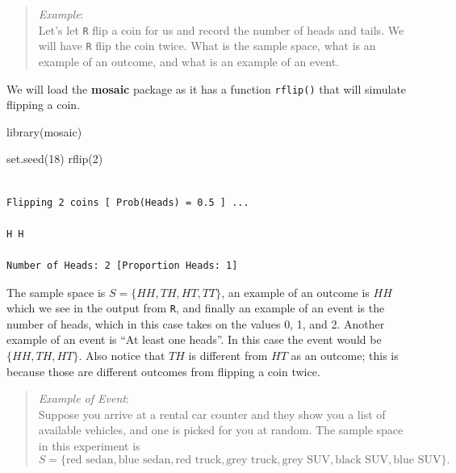 \documentclass[
  letterpaper,
  DIV=11,
  numbers=noendperiod]{scrreprt}
\newenvironment{Shaded}{\begin{snugshade}}{\end{snugshade}}
\newcommand{\DecValTok}[1]{\textcolor[rgb]{0.68,0.00,0.00}{#1}}
\newcommand{\FunctionTok}[1]{\textcolor[rgb]{0.28,0.35,0.67}{#1}}
\newcommand{\NormalTok}[1]{\textcolor[rgb]{0.00,0.23,0.31}{#1}}
\begin{document}
\begin{quote}
\emph{Example}:\\
Let's let \texttt{R} flip a coin for us and record the number of heads
and tails. We will have \texttt{R} flip the coin twice. What is the
sample space, what is an example of an outcome, and what is an example
of an event.
\end{quote}

We will load the \textbf{mosaic} package as it has a function
\texttt{rflip()} that will simulate flipping a coin.

\begin{Shaded}
\begin{Highlighting}[]
\FunctionTok{library}\NormalTok{(mosaic)}
\end{Highlighting}
\end{Shaded}

\begin{Shaded}
\begin{Highlighting}[]
\FunctionTok{set.seed}\NormalTok{(}\DecValTok{18}\NormalTok{)}
\FunctionTok{rflip}\NormalTok{(}\DecValTok{2}\NormalTok{)}
\end{Highlighting}
\end{Shaded}

\begin{verbatim}

Flipping 2 coins [ Prob(Heads) = 0.5 ] ...

H H

Number of Heads: 2 [Proportion Heads: 1]
\end{verbatim}

The sample space is \(S=\{HH, TH, HT, TT\}\), an example of an outcome
is \(HH\) which we see in the output from \texttt{R}, and finally an
example of an event is the number of heads, which in this case takes on
the values 0, 1, and 2. Another example of an event is ``At least one
heads''. In this case the event would be \(\{HH,TH, HT\}\). Also notice
that \(TH\) is different from \(HT\) as an outcome; this is because
those are different outcomes from flipping a coin twice.

\begin{quote}
\emph{Example of Event}:\\
Suppose you arrive at a rental car counter and they show you a list of
available vehicles, and one is picked for you at random. The sample
space in this experiment is \[
S=\{\mbox{red sedan}, \mbox{blue sedan}, \mbox{red truck}, \mbox{grey truck}, \mbox{grey SUV}, \mbox{black SUV}, \mbox{blue SUV}\}.
\]
\end{quote}
\end{document}
